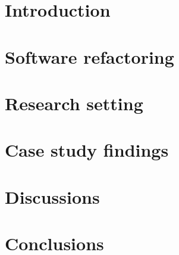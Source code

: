 \documentclass[english,12pt,a4paper,pdftex,sci,utf8]{aaltothesis}
\begin{document}


\section{Introduction} \label{introduction}

\clearpage

\section{Software refactoring} \label{literature}

\clearpage

\section{Research setting} \label{research setting}

\clearpage

\section{Case study findings} \label{case study}

\clearpage

\section{Discussions} \label{discussions}

\clearpage

\section{Conclusions} \label{conclusions}

\clearpage
\end{document}
